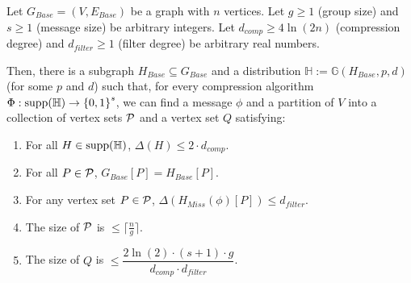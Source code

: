 \documentclass[11pt]{article}
\begin{document}
\begin{lemma}\label{compressed-partition}
Let $G_{Base}=(V, E_{Base})$ be a graph with $n$ vertices. Let $g\ge 1$ (group size) and $s\ge 1$ (message size) be arbitrary integers. Let $d_{comp}\ge4\ln(2n)$ (compression degree) and $d_{filter}\ge 1$ (filter degree) be arbitrary real numbers.

Then, there is a subgraph $H_{Base}\subseteq G_{Base}$ and a distribution $\mathbb{H}:=\mathbb{G}(H_{Base}, p, d)$ (for some $p$ and $d$) such that, for every compression algorithm $\Phi:\textnormal{\text{supp}}(\mathbb{H})\rightarrow {\{0, 1 \}}^s$, we can find a message $\phi$ and a partition of $V$ into a collection of vertex sets $\mathcal{P}$ and a vertex set $Q$ satisfying:
\begin{enumerate}
    \item\label{H-degree} For all $H\in \textnormal{\text{supp}}(\mathbb{H})$, $\Delta{(H)}\le 2\cdot d_{comp}$.
    \item\label{edge-in} For all $P\in \mathcal{P}$, $G_{Base}[P]=H_{Base}[P]$.
    \item\label{P-condition} For any vertex set $P\in \mathcal{P}$, $\Delta{(H_{Miss}(\phi)[P])}\le d_{filter}$. 
    \item\label{P-size} The size of $\mathcal{P}$ is $\le\lceil\frac ng\rceil$. 
    \item\label{Q-condition} The size of $Q$ is $\le \dfrac{2\ln (2)\cdot (s+1)\cdot g}{d_{comp}\cdot d_{filter}}$.
\end{enumerate}
\end{lemma}
\end{document}
